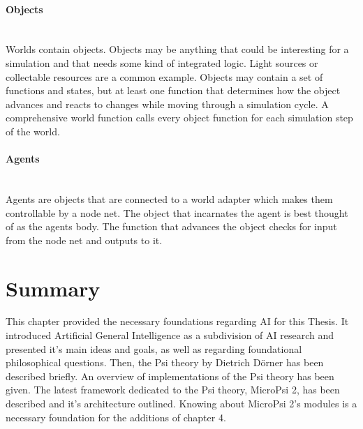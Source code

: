         \paragraph{Objects}$\;$ \\
Worlds contain objects. Objects may be anything that could be interesting for a simulation and that needs some kind of integrated logic. Light sources or collectable resources are a common example. Objects may contain a set of functions and states, but at least one function that determines how the object advances and reacts to changes while moving through a simulation cycle. A comprehensive world function calls every object function for each simulation step of the world.

        \paragraph{Agents}$\;$ \\
Agents are objects that are connected to a world adapter which makes them controllable by a node net. The object that incarnates the agent is best thought of as the agents body. The function that advances the object checks for input from the node net and outputs to it.
        
    \section{Summary}
This chapter provided the necessary foundations regarding AI for this Thesis. It introduced Artificial General Intelligence as a subdivision of AI research and presented it's main ideas and goals, as well as regarding foundational philosophical questions.
Then, the Psi theory by Dietrich Dörner has been described briefly. An overview of implementations of the Psi theory has been given. The latest framework dedicated to the Psi theory, MicroPsi 2, has been described and it's architecture outlined. Knowing about MicroPsi 2's modules is a necessary foundation for the additions of chapter 4.